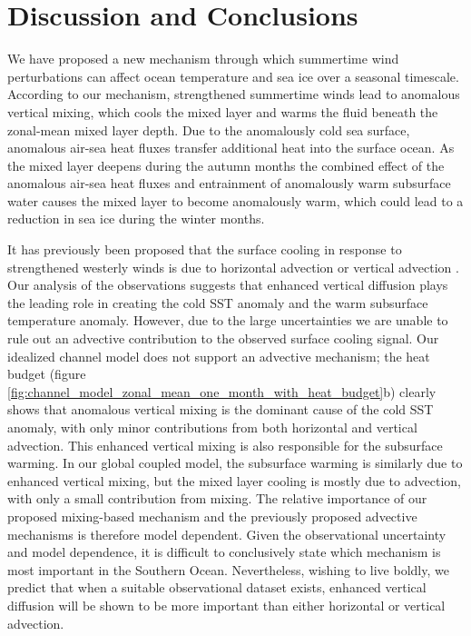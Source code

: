 \documentclass{ametsocV5}
\begin{document}









\section{Discussion and Conclusions} %
\label{sec:discussion}

We have proposed a new mechanism through which summertime wind perturbations can affect ocean temperature and sea ice over a seasonal timescale. According to our mechanism, strengthened summertime winds lead to anomalous vertical mixing, which cools the mixed layer and warms the fluid beneath the zonal-mean mixed layer depth. Due to the anomalously cold sea surface, anomalous air-sea heat fluxes transfer additional heat into the surface ocean. As the mixed layer deepens during the autumn months the combined effect of the anomalous air-sea heat fluxes and entrainment of anomalously warm subsurface water causes the mixed layer to become anomalously warm, which could lead to a reduction in sea ice during the winter months.


It has previously been proposed that the surface cooling in response to strengthened westerly winds is due to horizontal advection \citep{Ferreira2015} or vertical advection \citep{Purich2016}. Our analysis of the observations suggests that enhanced vertical diffusion plays the leading role in creating the cold SST anomaly and the warm subsurface temperature anomaly. However, due to the large uncertainties we are unable to rule out an advective contribution to the observed surface cooling signal. Our idealized channel model does not support an advective mechanism; the heat budget (figure \ref{fig:channel_model_zonal_mean_one_month_with_heat_budget}b) clearly shows that anomalous vertical mixing is the dominant cause of the cold SST anomaly, with only minor contributions from both horizontal and vertical advection. This enhanced vertical mixing is also responsible for the subsurface warming. In our global coupled model, the subsurface warming is similarly due to enhanced vertical mixing, but the mixed layer cooling is mostly due to advection, with only a small contribution from mixing. The relative importance of our proposed mixing-based mechanism and the previously proposed advective mechanisms \citep{Ferreira2015,Purich2016} is therefore model dependent. Given the observational uncertainty and model dependence, it is difficult to conclusively state which mechanism is most important in the Southern Ocean. Nevertheless, wishing to live boldly, we predict that when a suitable observational dataset exists, enhanced vertical diffusion will be shown to be more important than either horizontal or vertical advection.
\end{document}
